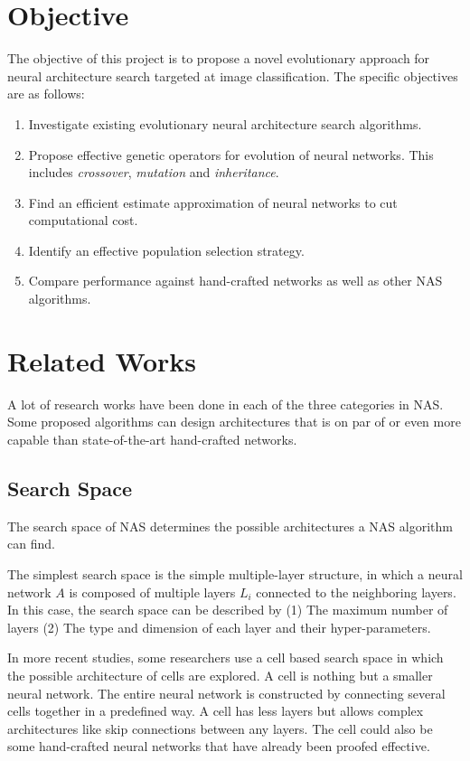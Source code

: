 \documentclass{article}
\begin{document}
\begin{normalsize}
   
    \section{Objective}

    The objective of this project is to propose a novel evolutionary approach for neural architecture search targeted at image classification. The specific objectives are as follows:
    \begin{enumerate}
      \item Investigate existing evolutionary neural architecture search algorithms.
      \item Propose effective genetic operators for evolution of neural networks. This includes \emph{crossover}, \emph{mutation} and \emph{inheritance}.
      \item Find an efficient estimate approximation of neural networks to cut computational cost.
      \item Identify an effective population selection strategy.
      \item Compare performance against hand-crafted networks as well as other NAS algorithms.
    \end{enumerate}

    \section{Related Works}
    A lot of research works have been done in each of the three categories in NAS. Some proposed algorithms can design architectures that is on par of or even more capable than state-of-the-art hand-crafted networks.
    
    \subsection{Search Space}
    
    The search space of NAS determines the possible architectures a NAS algorithm can find.

    The simplest search space is the simple multiple-layer structure, in which a neural network $A$ is composed of multiple layers $L_i$ connected to the neighboring layers. In this case, the search space can be described by (1) The maximum number of layers (2) The type and dimension of each layer and their hyper-parameters. 

    In more recent studies, some researchers use a cell based search space in which the possible architecture of cells are explored. A cell is nothing but a smaller neural network. The entire neural network is constructed by connecting several cells together  in a predefined way. A cell has less layers but allows complex architectures like skip connections between any layers. The cell could also be some hand-crafted neural networks that have already been proofed effective.

\end{normalsize}
\end{document}
